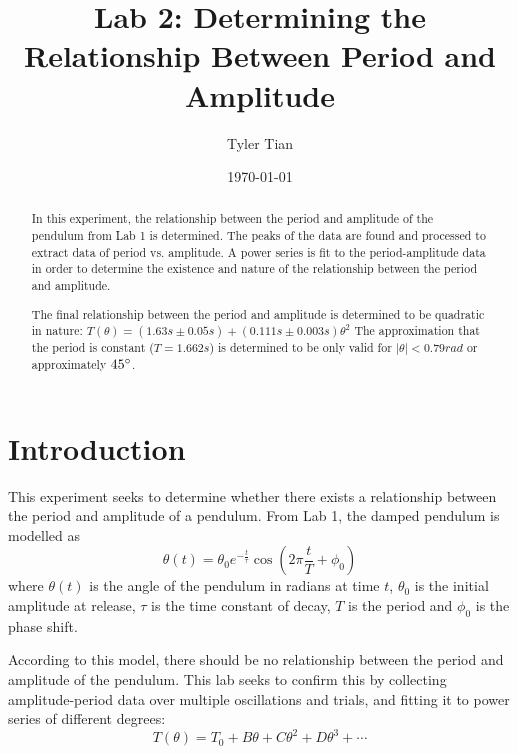 \documentclass[aps,twocolumn,secnumarabic,nobalancelastpage,amsmath,amssymb,nofootinbib,floatfix]{revtex4}
\begin{document}
\title{Lab 2: Determining the Relationship Between Period and Amplitude}
\author{Tyler Tian}
\date{\today}


\begin{abstract}
In this experiment, the relationship between the period and amplitude of the pendulum from Lab 1 is determined. The
peaks of the data are found and processed to extract data of period vs. amplitude. A power series is fit to the 
period-amplitude data in order to determine the existence and nature of the relationship between the period and
amplitude.

The final relationship between the period and amplitude is determined to be quadratic in nature:
$T(\theta) = (1.63\si{s} \pm 0.05\si{s}) + (0.111\si{s} \pm 0.003\si{s})\theta^2$ The approximation that the period
is constant ($T = 1.662\si{s}$) is determined to be only valid for $|\theta| < 0.79\si{rad}$ or approximately
$45\degree$.
\end{abstract}

\maketitle


\section{Introduction}

This experiment seeks to determine whether there exists a relationship between the period and amplitude of a pendulum.
From Lab 1, the damped pendulum is modelled as
\begin{equation}
    \theta(t) = \theta_0 e^{-\frac{t}{\tau}}\cos\left(2\pi\frac{t}{T} + \phi_0\right)
    \label{eqn:model}
\end{equation}
where $\theta(t)$ is the angle of the pendulum in radians at time $t$, $\theta_0$ is the initial amplitude at release,
$\tau$ is the time constant of decay, $T$ is the period and $\phi_0$ is the phase shift.

According to this model, there should be no relationship between the period and amplitude of the pendulum. This lab
seeks to confirm this by collecting amplitude-period data over multiple oscillations and trials, and fitting it to power
series of different degrees:
\begin{equation}
    T(\theta) = T_0 + B\theta + C\theta^2 + D\theta^3 + \cdots
    \label{eqn:power_series}
\end{equation}
\end{document}
